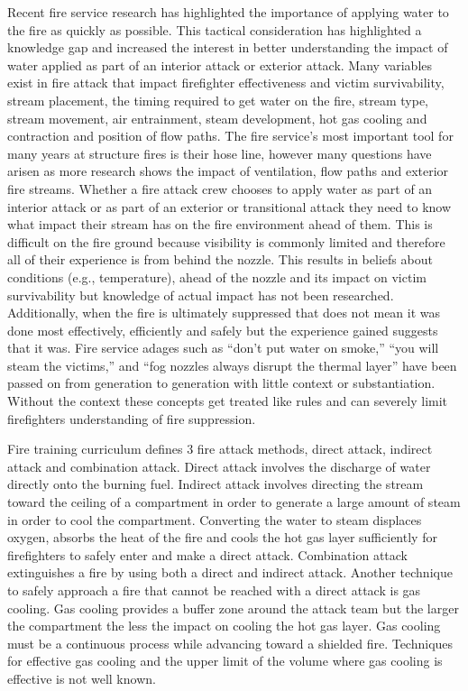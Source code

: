 \documentclass{article}
\begin{document}
Recent fire service research has highlighted the importance of applying water to the fire as quickly as possible. This tactical consideration has highlighted a knowledge gap and increased the interest in better understanding the impact of water applied as part of an interior attack or exterior attack. Many variables exist in fire attack that impact firefighter effectiveness and victim survivability, stream placement, the timing required to get water on the fire, stream type, stream movement, air entrainment, steam development, hot gas cooling and contraction and position of flow paths. The fire service's most important tool for many years at structure fires is their hose line, however many questions have arisen as more research shows the impact of ventilation, flow paths and exterior fire streams. Whether a fire attack crew chooses to apply water as part of an interior attack or as part of an exterior or transitional attack they need to know what impact their stream has on the fire environment ahead of them. This is difficult on the fire ground because visibility is commonly limited and therefore all of their experience is from behind the nozzle. This results in beliefs about conditions (e.g., temperature), ahead of the nozzle and its impact on victim survivability but knowledge of actual impact has not been researched. Additionally, when the fire is ultimately suppressed that does not mean it was done most effectively, efficiently and safely but the experience gained suggests that it was. Fire service adages such as ``don’t put water on smoke,'' ``you will steam the victims,'' and ``fog nozzles always disrupt the thermal layer'' have been passed on from generation to generation with little context or substantiation. Without the context these concepts get treated like rules and can severely limit firefighters understanding of fire suppression.

Fire training curriculum defines 3 fire attack methods, direct attack, indirect attack and combination attack. Direct attack involves the discharge of water directly onto the burning fuel. Indirect attack involves directing the stream toward the ceiling of a compartment in order to generate a large amount of steam in order to cool the compartment. Converting the water to steam displaces oxygen, absorbs the heat of the fire and cools the hot gas layer sufficiently for firefighters to safely enter and make a direct attack. Combination attack extinguishes a fire by using both a direct and indirect attack. Another technique to safely approach a fire that cannot be reached with a direct attack is gas cooling. Gas cooling provides a buffer zone around the attack team but the larger the compartment the less the impact on cooling the hot gas layer. Gas cooling must be a continuous process while advancing toward a shielded fire. Techniques for effective gas cooling and the upper limit of the volume where gas cooling is effective is not well known.  
\end{document}
